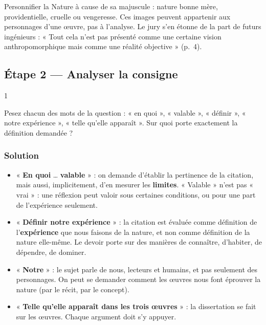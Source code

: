 \documentclass[11pt,a4paper]{article}
\providecommand{\tightlist}{\setlength{\itemsep}{0pt}\setlength{\parskip}{0pt}}
\begin{document}
\begin{piege}

Personnifier la Nature à cause de sa majuscule : nature bonne mère, providentielle, cruelle ou vengeresse. Ces images peuvent appartenir aux personnages d'une œuvre, pas à l'analyse. Le jury s'en étonne de la part de futurs ingénieurs : « Tout cela n'est pas présenté comme une certaine vision anthropomorphique mais comme une réalité objective » (p.~4).

\end{piege}

\hypertarget{uxe9tape-2-analyser-la-consigne}{%
\subsection{Étape 2 --- Analyser la consigne}\label{uxe9tape-2-analyser-la-consigne}}

\begin{indication}{1}

Pesez chacun des mots de la question : « en quoi », « valable », « définir », « notre expérience », « telle qu'elle apparaît ». Sur quoi porte exactement la définition demandée ?

\end{indication}

\hypertarget{solution-1}{%
\subsubsection{Solution}\label{solution-1}}

\begin{itemize}
\tightlist
\item
  « \textbf{En quoi} \ldots{} \textbf{valable} » : on demande d'établir la pertinence de la citation, mais aussi, implicitement, d'en mesurer les \textbf{limites}. « Valable » n'est pas « vrai » : une réflexion peut valoir sous certaines conditions, ou pour une part de l'expérience seulement.
\item
  « \textbf{Définir notre expérience} » : la citation est évaluée comme définition de l'\textbf{expérience} que nous faisons de la nature, et non comme définition de la nature elle-même. Le devoir porte sur des manières de connaître, d'habiter, de dépendre, de dominer.
\item
  « \textbf{Notre} » : le sujet parle de nous, lecteurs et humains, et pas seulement des personnages. On peut se demander comment les œuvres nous font éprouver la nature (par le récit, par le concept).
\item
  « \textbf{Telle qu'elle apparaît dans les trois œuvres} » : la dissertation se fait sur les œuvres. Chaque argument doit s'y appuyer.
\end{itemize}
\end{document}
